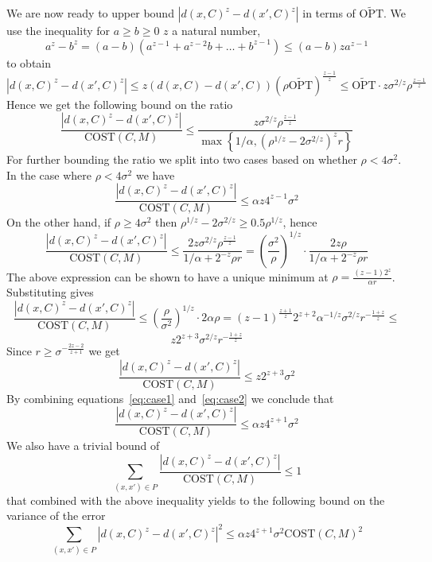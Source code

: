 \documentclass[11pt]{article}
\newcommand{\cost}{\text{COST}}
\newcommand{\topt}{\widetilde{\text{OPT}}}
\begin{document}
We are now ready to upper bound $|d(x,C)^z - d(x',C)^z|$ in terms of $\topt$. We use the inequality for $a \geq b \geq 0$ $z$ a natural number,
$$ a^z-b^z = (a-b)(a^{z-1}+a^{z-2}b+\ldots+b^{z-1})  \leq (a-b)z a^{z-1}$$
to obtain
$$   \left| d(x,C)^z - d(x',C)^z \right| \leq z \left( d(x,C) - d(x',C) \right) (\rho \topt)^{\frac{z-1}{z}} \leq \topt \cdot z \sigma^{2/z} \rho^{\frac{z-1}{z}} $$
Hence we get the following bound on the ratio
$$ \frac{ \left| d(x,C)^z - d(x',C)^z \right|}{\cost(C,M)} \leq \frac{z \sigma^{2/z} \rho^{\frac{z-1}{z}}} {\max\left\{ 1/\alpha, \left( \rho^{1/z} - 2\sigma^{2/z}\right)^z r \right\}}$$
For further bounding the ratio we split into two cases based on whether $\rho < 4\sigma^2$. In the case where $\rho < 4\sigma^2$ we have
\begin{equation} \label{eq:case1}
\frac{ \left| d(x,C)^z - d(x',C)^z \right|}{\cost(C,M)} \leq \alpha z 4^{z-1} \sigma^{2} 
\end{equation} 
On the other hand, if $\rho \geq 4\sigma^2$ then $\rho^{1/z} - 2\sigma^{2/z} \geq 0.5 \rho^{1/z}$, hence
$$ \frac{ \left| d(x,C)^z - d(x',C)^z \right|}{\cost(C,M)} \leq \frac{2 z \sigma^{2/z} \rho^{\frac{z-1}{z}}} {1/\alpha + 2^{-z} \rho r } = \left(\frac{\sigma^2}{\rho}\right)^{1/z} \cdot   \frac{2 z \rho} {1/\alpha + 2^{-z} \rho r } $$
The above expression can be shown to have a unique minimum at $\rho = \frac{(z-1)2^z}{\alpha r}$. Substituting gives
$$ \frac{ \left| d(x,C)^z - d(x',C)^z \right|}{\cost(C,M)} \leq \left(\frac{\rho}{\sigma^2}\right)^{1/z} \cdot 2\alpha \rho = (z-1)^{\frac{z+1}{z}}2^{z+2} \alpha^{-1/z}  \sigma^{2/z} r^{-\frac{1+z}{z}} \leq$$
$$ z 2^{z+3}   \sigma^{2/z} r^{-\frac{1+z}{z}} $$
Since $r \geq \sigma^{-\frac{2z-2}{z+1}}$ we get 
\begin{equation} \label{eq:case2}
\frac{ \left| d(x,C)^z - d(x',C)^z \right|}{\cost(C,M)} \leq z 2^{z+3}   \sigma^{2} 
\end{equation} 
By combining equations~\eqref{eq:case1} and~\eqref{eq:case2} we conclude that
$$\frac{ \left| d(x,C)^z - d(x',C)^z \right|}{\cost(C,M)} \leq \alpha z 4^{z+1}   \sigma^{2}  $$
We also have a trivial bound of
$$\sum_{(x,x') \in P} \frac{ \left| d(x,C)^z - d(x',C)^z \right|}{\cost(C,M)} \leq 1  $$
that combined with the above inequality yields to the following bound on the variance of the error
\begin{equation} \label{eq:compact_subg}
\sum_{(x,x') \in P}  \left| d(x,C)^z - d(x',C)^z \right|^2\leq \alpha z 4^{z+1}   \sigma^{2} \cost(C,M)^2 
\end{equation}
\end{document}
